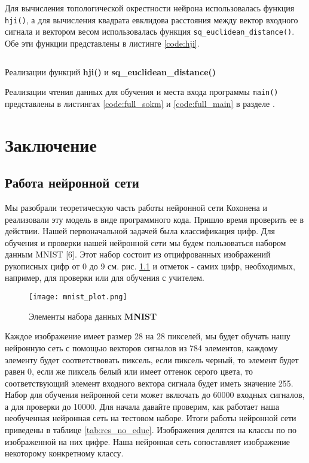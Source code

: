 \documentclass[a4paper,12pt]{report}
\begin{document}
Для вычисления топологической окрестности нейрона использовалась
функция \verb|hji()|, а для вычисления квадрата евклидова расстояния
между вектор входного сигнала и вектором весом использовалась функция
\verb|sq_euclidean_distance()|. Обе эти функции представлены в листинге
\ref{code:hji}.

\begin{code}
    \inputminted{cpp}{code/train.hpp}
    \caption{Реализации функций \textbf{hji()} и \textbf{sq\_euclidean\_distance()}}
    \label{code:hji}
\end{code}
\vspace{5mm}

Реализации чтения данных для обучения и места входа программы \verb|main()|
представлены в листингах \ref{code:full_sokm}
и \ref{code:full_main} в разделе .

\chapter{Заключение}
\section{Работа нейронной сети}
Мы разобрали теоретическую часть работы нейронной сети Кохонена и
реализовали эту модель в виде программного кода. Пришло время
проверить ее в действии. Нашей первоначальной задачей была
классификация цифр. Для обучения и проверки нашей нейронной сети мы
будем пользоваться набором данным MNIST [6]. Этот набор состоит из
отцифрованных изображений
рукописных цифр от 0 до 9 см. рис. \ref{fig:mnist_ex} и отметок -
самих цифр, необходимых, например, для проверки или для обучения с
учителем.

\begin{figure}[!htb]
    \centering
    \captionsetup{justification=centering}
    \texttt{[image: mnist\_plot.png]}
    \caption{Элементы набора данных \textbf{MNIST}}
    \label{fig:mnist_ex}
\end{figure}

Каждое изображение имеет размер 28 на 28 пикселей, мы будет
обучать нашу нейронную сеть с помощью векторов сигналов из 784
элементов, каждому элементу будет соответствовать пиксель, если
пиксель черный, то элемент будет равен 0, если же пиксель белый или
имеет оттенок серого цвета, то соответствующий элемент входного
вектора сигнала будет иметь значение 255. Набор для обучения нейронной
сети может включать до 60000 входных сигналов, а для проверки до
10000. Для начала давайте проверим, как работает наша необученная
нейронная сеть на тестовом наборе. Итоги работы нейронной сети
приведены в таблице \ref{tab:res_no_educ}. Изображения делятся на классы по по
изображенной на них цифре. Наша нейронная сеть сопоставляет
изображение некоторому конкретному классу.
\end{document}
